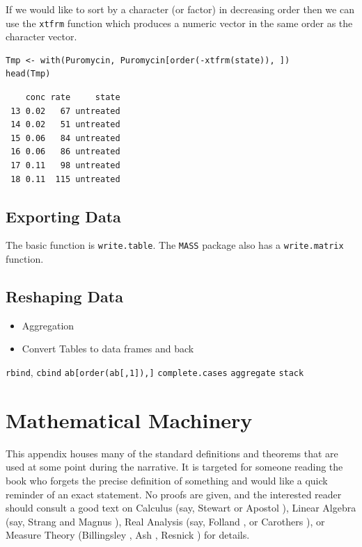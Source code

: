 \documentclass[captions=tableheading]{scrbook}
\begin{document}
\begin{example}
If we would like to sort by a character (or factor) in decreasing order then we can use the \texttt{xtfrm} function which produces a numeric vector in the same order as the character vector.


\begin{verbatim}
Tmp <- with(Puromycin, Puromycin[order(-xtfrm(state)), ])
head(Tmp)
\end{verbatim}

\begin{verbatim}
    conc rate     state
 13 0.02   67 untreated
 14 0.02   51 untreated
 15 0.06   84 untreated
 16 0.06   86 untreated
 17 0.11   98 untreated
 18 0.11  115 untreated
\end{verbatim}
\section{Exporting Data}
\label{sec-20-5}
\label{sec-Exporting-a-Data}


The basic function is \texttt{write.table}. The \texttt{MASS} package also has a \texttt{write.matrix} function.
\section{Reshaping Data}
\label{sec-20-6}
\label{sec-Reshaping-a-Data}


\begin{itemize}
\item Aggregation
\item Convert Tables to data frames and back
\end{itemize}

\texttt{rbind}, \texttt{cbind}
\texttt{ab[order(ab[,1]),]}
\texttt{complete.cases}
\texttt{aggregate}
\texttt{stack}
\chapter{Mathematical Machinery}
\label{sec-21}
\label{cha-Mathematical-Machinery}


This appendix houses many of the standard definitions and theorems that are used at some point during the narrative. It is targeted for someone reading the book who forgets the precise definition of something and would like a quick reminder of an exact statement. No proofs are given, and the interested reader should consult a good text on Calculus (say, Stewart \cite{Stewart2008} or Apostol \cite{Apostol1967,ApostolI1967}), Linear Algebra (say, Strang \cite{Strang1988} and Magnus \cite{Magnus1999}), Real Analysis (say, Folland \cite{Folland1999}, or Carothers \cite{Carothers2000}), or Measure Theory (Billingsley \cite{Billingsley1995}, Ash \cite{Ash2000}, Resnick \cite{Resnick1999}) for details. 

\end{example}
\end{document}
